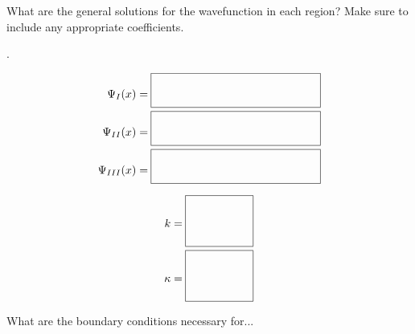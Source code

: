	\begin{questions}
	
		\question What are the general solutions for the wavefunction in each region? Make sure to include any appropriate coefficients.
		
			\begin{minipage}{0.1\textwidth}.
			\end{minipage}
			\begin{minipage}{0.4\textwidth}
			\begingroup
\addtolength{\jot}{1em}
			\begin{align*}
				\Psi_I(x) = \answerbox{150}\\
				\Psi_{II}(x) = \answerbox{150}\\
				\Psi_{III}(x) = \answerbox{150}
			\end{align*}
			\endgroup
			\end{minipage}
			\begin{minipage}{0.4\textwidth}
			\begingroup
\addtolength{\jot}{1em}
			\begin{align*}
				k = \answerboxtall{60}\\
				\kappa = \answerboxtall{60}
			\end{align*}
			\endgroup
			\end{minipage}
			
			\vspace{0.1in}
		\question What are the boundary conditions necessary for...
		
\end{questions}
